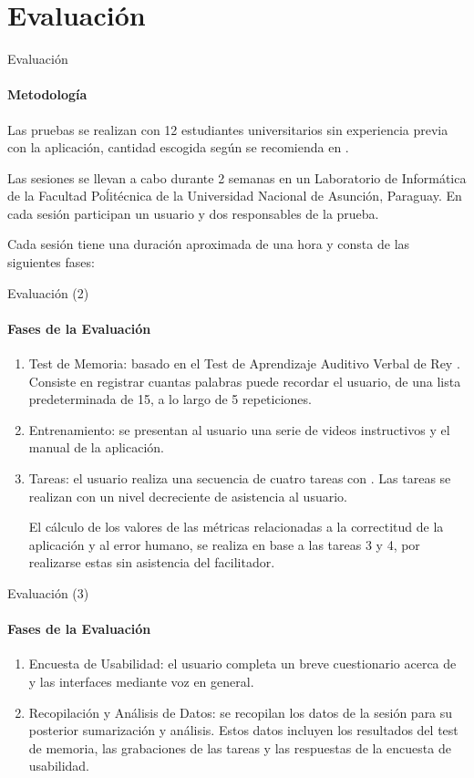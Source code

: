 \section{Evaluaci\'on}

\begin{frame}{Evaluaci\'on}
\framesubtitle{Metodolog\'ia}
Las pruebas se realizan con 12 estudiantes universitarios sin experiencia previa 
con la aplicaci\'on, cantidad escogida seg\'un se recomienda en \cite{Hwang:2010}.

Las sesiones se llevan a cabo durante 2 semanas en un Laboratorio de Inform\'atica de 
la Facultad Poĺit\'ecnica de la Universidad Nacional de Asunci\'on, Paraguay.
En cada sesi\'on participan un usuario y dos responsables de la prueba.
\end{frame}

Cada sesión tiene una duración aproximada de una hora y consta de las siguientes
fases:

\begin{frame}{Evaluaci\'on (2)}
\framesubtitle{Fases de la Evaluaci\'on}
\begin{enumerate}
    \item Test de Memoria: basado en el Test de Aprendizaje Auditivo Verbal de Rey \cite{Lopez1998}.
    Consiste en registrar cuantas palabras puede recordar el usuario, de una lista predeterminada de 15,
    a lo largo de 5 repeticiones. 
    \item Entrenamiento: se presentan al usuario una serie de videos instructivos y el manual de la 
    aplicaci\'on.
    \item Tareas: el usuario realiza una secuencia de cuatro tareas con .
    Las tareas se realizan con un nivel decreciente de asistencia al usuario.
    
    El c\'alculo de los valores de las m\'etricas relacionadas a la correctitud de la aplicaci\'on y al 
    error humano, se realiza en base a las tareas 3 y 4, por realizarse estas sin asistencia del 
    facilitador.
\end{enumerate}
\end{frame}


\begin{frame}{Evaluaci\'on (3)}
\framesubtitle{Fases de la Evaluaci\'on}
\begin{enumerate}

    \item Encuesta de Usabilidad: el usuario completa un breve cuestionario acerca de 
     y las interfaces mediante voz en general.
    \item Recopilaci\'on y An\'alisis de Datos: se recopilan los datos de la sesi\'on para su posterior
    sumarizaci\'on y an\'alisis. Estos datos incluyen los resultados del test de memoria, las grabaciones de las tareas y las respuestas de la encuesta de usabilidad.
\end{enumerate}
\end{frame}


